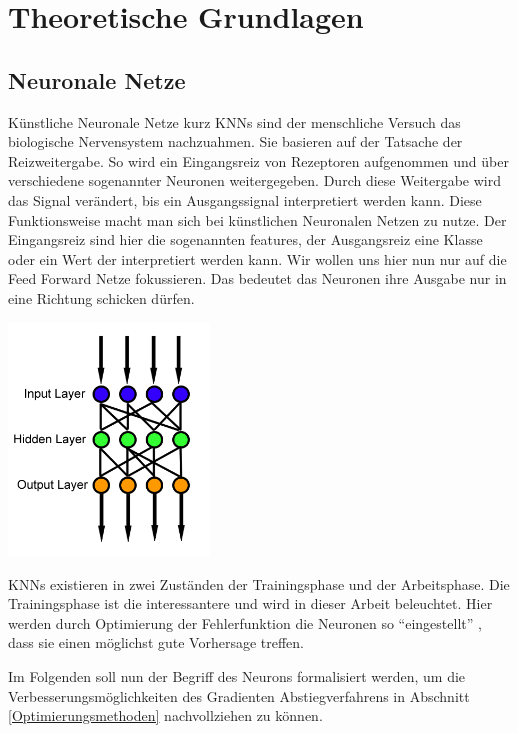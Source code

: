 
\section{Theoretische Grundlagen}\label{Theoretische Grundlagen}


\subsection{Neuronale Netze}\label{Neuronale Netze}

Künstliche Neuronale Netze kurz KNNs sind der menschliche
Versuch das biologische Nervensystem nachzuahmen.
Sie basieren auf der Tatsache der Reizweitergabe. 
So wird ein Eingangsreiz von Rezeptoren aufgenommen 
und über verschiedene sogenannter Neuronen weitergegeben.
Durch diese Weitergabe wird das Signal verändert,
bis ein Ausgangssignal interpretiert werden kann. 
Diese Funktionsweise macht man sich bei künstlichen
Neuronalen Netzen zu nutze.
Der Eingangsreiz sind hier 
die sogenannten \grqq features\grqq{}, 
der Ausgangsreiz eine Klasse oder ein Wert
der interpretiert werden kann.
Wir wollen uns hier nun nur auf die \grqq Feed Forward\grqq{}
Netze fokussieren. Das bedeutet das Neuronen ihre Ausgabe
nur in eine Richtung schicken dürfen.


\begin{center}
 \includegraphics[width=0.4\textwidth]{abb/Feed_forward_neural_net.png}
\end{center}


KNNs existieren in zwei Zuständen der Trainingsphase
und der Arbeitsphase. 
Die Trainingsphase ist die interessantere und wird in
dieser Arbeit beleuchtet. Hier werden durch Optimierung 
der Fehlerfunktion die Neuronen so ``eingestellt'' ,
dass sie einen möglichst gute Vorhersage treffen. 

Im Folgenden soll nun der Begriff des Neurons formalisiert 
werden, um die Verbesserungsmöglichkeiten des Gradienten
Abstiegverfahrens in Abschnitt \ref{Optimierungsmethoden} 
nachvollziehen zu können.


